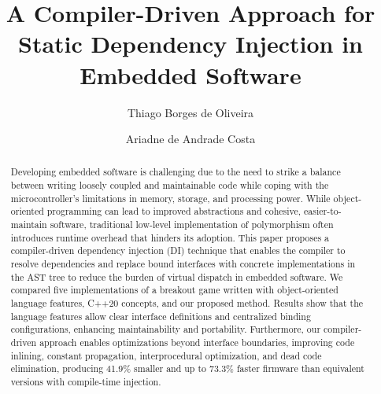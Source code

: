 \documentclass[sigconf]{acmart}
\begin{document}
\title{A Compiler-Driven Approach for Static Dependency Injection in Embedded Software}
\renewcommand{\shorttitle}{A Compiler-Driven Approach for Static DI in Embedded Software}

\author{Thiago Borges de Oliveira}

\author{Ariadne de Andrade Costa}

\renewcommand{\shortauthors}{de Oliveira and Costa}
\renewcommand\abstractname{ABSTRACT}
\renewcommand\keywordsname{KEYWORDS}
\renewcommand\refname{REFERENCES}


\begin{abstract}
Developing embedded software is challenging due to the need to strike a balance between writing loosely coupled and maintainable code while coping with the microcontroller's limitations in memory, storage, and processing power. While object-oriented programming can lead to improved abstractions and cohesive, easier-to-maintain software, traditional low-level implementation of polymorphism often introduces runtime overhead that hinders its adoption. This paper proposes a compiler-driven dependency injection (DI) technique that enables the compiler to resolve dependencies and replace bound interfaces with concrete implementations in the AST tree to reduce the burden of virtual dispatch in embedded software. We compared five implementations of a breakout game written with object-oriented language features, C++20 concepts, and our proposed method. Results show that the language features allow clear interface definitions and centralized binding configurations, enhancing maintainability and portability. Furthermore, our compiler-driven approach enables optimizations beyond interface boundaries, improving code inlining, constant propagation, interprocedural optimization, and dead code elimination, producing 41.9\% smaller and up to 73.3\% faster firmware than equivalent versions with compile-time injection.
\end{abstract}
\end{document}
